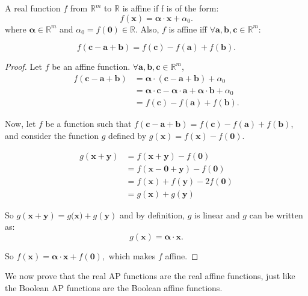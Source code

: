 \begin{property}
  \label{PROPRE:f_affine_real}
  A real function $f$ from $\mathbb{R}^m$ to $\mathbb{R}$ is affine if f is of
  the form: $$f(\mathbf{x}) = \boldsymbol{\alpha} \cdot \mathbf{x} +
  \alpha_0.$$ where $\boldsymbol{\alpha} \in \mathbb{R}^m$ and $\alpha_0  =
  f(\mathbf{0}) \in \mathbb{R}$.
  Also, $f$ is affine iff $\forall \mathbf{a}, \mathbf{b}, \mathbf{c} \in
  \mathbb{R}^m$:

  $$f(\mathbf{c} - \mathbf{a} + \mathbf{b}) = f(\mathbf{c}) - f(\mathbf{a}) +
  f(\mathbf{b}).$$
\end{property}
\begin{proof}
  Let $f$ be an affine function.
  $\forall \mathbf{a}, \mathbf{b}, \mathbf{c} \in \mathbb{R}^m$,
  \begin{align*}
    f(\mathbf{c} - \mathbf{a} + \mathbf{b}) &= \boldsymbol{\alpha} \cdot (\mathbf{c}
    - \mathbf{a} + \mathbf{b}) + \alpha_0\\
    &= \boldsymbol{\alpha} \cdot \mathbf{c} - \boldsymbol{\alpha} \cdot
    \mathbf{a} + \boldsymbol{\alpha} \cdot \mathbf{b} + \alpha_0\\
    &= f(\mathbf{c}) - f(\mathbf{a}) + f(\mathbf{b}).
  \end{align*}

  Now, let $f$ be a function such that $f(\mathbf{c} - \mathbf{a} +
  \mathbf{b}) = f(\mathbf{c}) - f(\mathbf{a}) + f(\mathbf{b})$, and consider
  the function $g$ defined by $g(\mathbf{x}) = f(\mathbf{x}) - f(\mathbf{0}).$

  \begin{align*}
    g(\mathbf{x} + \mathbf{y}) &= f(\mathbf{x} + \mathbf{y}) - f(\mathbf{0})\\
    &= f(\mathbf{x} - \mathbf{0} + \mathbf{y}) - f(\mathbf{0})\\
    &= f(\mathbf{x}) + f(\mathbf{y}) - 2f(\mathbf{0})\\
    &= g(\mathbf{x}) + g(\mathbf{y})
  \end{align*}

  So $g(\mathbf{x} + \mathbf{y}) = g(\mathbf{x)} + g(\mathbf{y})$ and by
  definition, $g$ is linear and $g$ can be written as:
  $$g(\mathbf{x}) = \boldsymbol{\alpha} \cdot \mathbf{x}.$$

  So $f(\mathbf{x}) = \boldsymbol{\alpha} \cdot \mathbf{x} + f(\mathbf{0}),$
  which makes $f$ affine.
\end{proof}

We now prove that the real AP functions are the real affine functions, just
like the Boolean AP functions are the Boolean affine functions.

